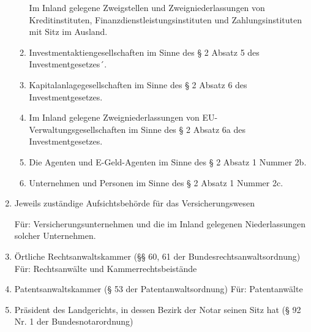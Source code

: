\documentclass{article}
\begin{document}
\begin{enumerate}
\begin{enumerate}
                            Im Inland gelegene Zweigstellen und Zweigniederlassungen von
                            Kreditinstituten, Finanzdienstleistungsinstituten und
                            Zahlungsinstituten mit Sitz im Ausland.

                        \item

                            Investmentaktiengesellschaften im Sinne des § 2 Absatz 5 des
                            Investmentgesetzes´.

                        \item

                            Kapitalanlagegesellschaften im Sinne des § 2 Absatz 6 des
                            Investmentgesetzes.

                        \item

                            Im Inland gelegene Zweigniederlassungen von EU-
                            Verwaltungsgesellschaften im Sinne des § 2 Absatz 6a des
                            Investmentgesetzes.

                        \item

                            Die Agenten und E-Geld-Agenten im Sinne des § 2 Absatz 1 Nummer 2b.

                        \item

                            Unternehmen und Personen im Sinne des § 2 Absatz 1 Nummer 2c.

                    \end{enumerate}

                \item Jeweils zuständige Aufsichtsbehörde für das Versicherungswesen

                    Für: Versicherungsunternehmen und die im Inland gelegenen Niederlassungen solcher Unternehmen.

                \item Örtliche Rechtsanwaltskammer (§§ 60, 61 der Bundesrechtsanwaltsordnung)
                    Für: Rechtsanwälte und Kammerrechtsbeistände

                \item  Patentsanwaltskammer (§ 53 der Patentanwaltsordnung)
                    Für: Patentanwälte

                \item Präsident des Landgerichts, in dessen Bezirk der Notar seinen Sitz hat (§ 92 Nr. 1 der Bundesnotarordnung)


\end{enumerate}
\end{document}
